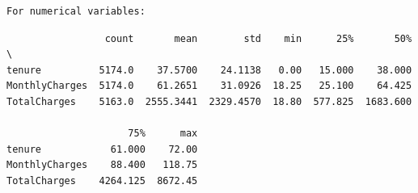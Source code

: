 \documentclass[8pt,onecolumn,aps,pra]{revtex4-1}
\begin{document}
    
    \begin{Verbatim}[commandchars=\\\{\}]
For numerical variables:

    \end{Verbatim}

    
    \begin{verbatim}
                 count       mean        std    min      25%       50%  \
tenure          5174.0    37.5700    24.1138   0.00   15.000    38.000   
MonthlyCharges  5174.0    61.2651    31.0926  18.25   25.100    64.425   
TotalCharges    5163.0  2555.3441  2329.4570  18.80  577.825  1683.600   

                     75%      max  
tenure            61.000    72.00  
MonthlyCharges    88.400   118.75  
TotalCharges    4264.125  8672.45  
    \end{verbatim}

    
    \begin{center}
    \end{center}
    { \hspace*{\fill} \\}
    
    \begin{center}
    \end{center}
    { \hspace*{\fill} \\}
    
    \begin{center}
    \end{center}
    { \hspace*{\fill} \\}
    
    \begin{center}
    \end{center}
    { \hspace*{\fill} \\}
    
\end{document}
